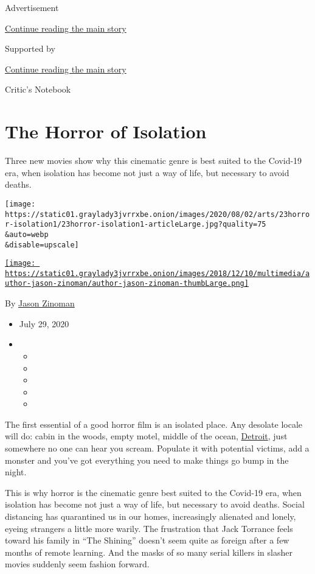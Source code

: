 Advertisement

\protect\hyperlink{after-top}{Continue reading the main story}

Supported by

\protect\hyperlink{after-sponsor}{Continue reading the main story}

Critic's Notebook

\hypertarget{the-horror-of-isolation}{%
\section{The Horror of Isolation}\label{the-horror-of-isolation}}

Three new movies show why this cinematic genre is best suited to the
Covid-19 era, when isolation has become not just a way of life, but
necessary to avoid deaths.

\texttt{[image: https://static01.graylady3jvrrxbe.onion/images/2020/08/02/arts/23horror-isolation1/23horror-isolation1-articleLarge.jpg?quality=75\\\&auto=webp\\\&disable=upscale]}

\href{https://www.nytimes3xbfgragh.onion/by/jason-zinoman}{\texttt{[image: https://static01.graylady3jvrrxbe.onion/images/2018/12/10/multimedia/author-jason-zinoman/author-jason-zinoman-thumbLarge.png]}}

By \href{https://www.nytimes3xbfgragh.onion/by/jason-zinoman}{Jason
Zinoman}

\begin{itemize}
\item
  July 29, 2020
\item
  \begin{itemize}
  \item
  \item
  \item
  \item
  \item
  \end{itemize}
\end{itemize}

The first essential of a good horror film is an isolated place. Any
desolate locale will do: cabin in the woods, empty motel, middle of the
ocean,
\href{https://www.freep.com/story/entertainment/movies/julie-hinds/2016/08/25/dont-breathe-horror-film-detroit/89304296/}{Detroit},
just somewhere no one can hear you scream. Populate it with potential
victims, add a monster and you've got everything you need to make things
go bump in the night.

This is why horror is the cinematic genre best suited to the Covid-19
era, when isolation has become not just a way of life, but necessary to
avoid deaths. Social distancing has quarantined us in our homes,
increasingly alienated and lonely, eyeing strangers a little more
warily. The frustration that Jack Torrance feels toward his family in
``The Shining'' doesn't seem quite as foreign after a few months of
remote learning. And the masks of so many serial killers in slasher
movies suddenly seem fashion forward.

